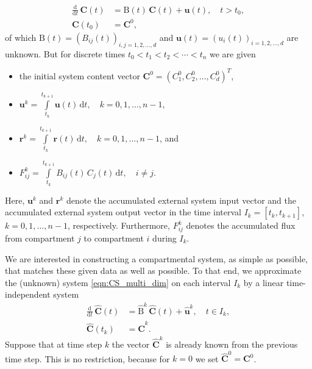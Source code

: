 \documentclass[11pt,a4paper]{article}
\renewcommand{\vec}[1]{\mathbf{#1}}
\newcommand{\tens}[1]{\mathrm{#1}}
\newcommand{\deriv}[1]{\frac{\mathrm{d}}{\mathrm{d}#1}}
\newcommand{\dd}[1]{\,\mathrm{d}#1}
\newcommand{\intl}{\int\limits}
\begin{document}
        \begin{equation}\label{eqn:CS_multi_dim}
            \begin{aligned}
                \deriv{t}\,\vec{C}(t) &= \tens{B}(t)\,\vec{C}(t) + \vec{u}(t),\quad t>t_0,\\
                \vec{C}(t_0) &= \vec{C}^0,
            \end{aligned}
        \end{equation}
        of which $\tens{B}(t)=(B_{ij}(t))_{i,j=1,2,\ldots,d}$ and $\vec{u}(t)=(u_i(t))_{i=1,2,\ldots,d}$ are unknown.
        But for discrete times $t_0<t_1<t_2<\cdots<t_n$ we are given
        \begin{itemize}
            \item the initial system content vector $\vec{C}^0=(C^0_1,C^0_2,\ldots,C^0_d)^T$,
            \item $\vec{u}^k = \intl_{t_k}^{t_{k+1}} \vec{u}(t)\dd{t},\quad k=0,1,\ldots,n-1$, 
            \item $\vec{r}^k = \intl_{t_k}^{t_{k+1}} \vec{r}(t)\dd{t},\quad k=0,1,\ldots,n-1$, and
            \item $F_{ij}^k = \intl_{t_k}^{t_{k+1}} B_{ij}(t)\,C_j(t)\dd{t},\quad i\neq j$.
        \end{itemize}
        Here, $\vec{u}^k$ and $\vec{r}^k$ denote the accumulated external system input vector and the accumulated external system output vector in the time interval $I_k=[t_k,t_{k+1}]$, $k=0,1,\ldots,n-1$, respectively.
        Furthermore, $F^k_{ij}$ denotes the accumulated flux from compartment $j$ to compartment $i$ during $I_k$.

        We are interested in constructing a compartmental system, as simple as possible, that matches these given data as well as possible.
        To that end, we approximate the (unknown) system \eqref{eqn:CS_multi_dim} on each interval $I_k$ by a linear time-independent system
        \begin{equation}\label{eqn:CS_multi_dim_approx}
            \begin{aligned}
                \deriv{t}\,\widehat{\vec{C}}(t) &= \widehat{\tens{B}}^k\,\widehat{\vec{C}}(t) + \widehat{\vec{u}}^k,\quad t\in I_k,\\
                \widehat{\vec{C}}(t_k) &= \widehat{\vec{C}}^k.
            \end{aligned}
        \end{equation}
        Suppose that at time step $k$ the vector $\widehat{\vec{C}}^k$ is already known from the previous time step.
        This is no restriction, because for $k=0$ we set $\widehat{\vec{C}}^0=\vec{C}^0$.
\end{document}
